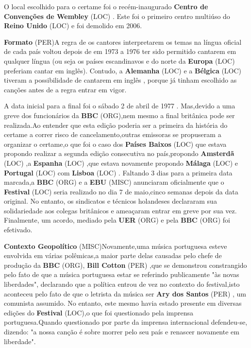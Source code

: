 \documentclass[12pt,a4paper]{article}
\begin{document}
O local escolhido para o certame foi o recém-inaugurado \textbf{Centro de Convenções de Wembley} (LOC) . Este foi o primeiro centro multiúso do \textbf{Reino Unido} (LOC) e foi demolido em 2006.



\textbf{Formato} (PER)A regra de os cantores interpretarem os temas na língua oficial de cada país voltou depois de em 1973 a 1976 ter sido permitido cantarem em qualquer língua (ou seja os países escandinavos e do norte da \textbf{Europa} (LOC) preferiam cantar em inglês). Contudo, a \textbf{Alemanha} (LOC) e a \textbf{Bélgica} (LOC) tiveram a possibilidade de cantarem em inglês , porque já tinham escolhido as canções antes de a regra entrar em vigor.

A data inicial para a final foi o sábado 2 de abril de 1977 . Mas,devido a uma greve dos funcionários da \textbf{BBC} (ORG),nem mesmo a final britânica pode ser realizada.Ao entender que esta edição poderia ser a primeira da história do certame a correr risco de cancelamento,outras emissoras se propuseram a organizar o certame,o que foi o caso dos \textbf{Países Baixos} (LOC) que estava propondo realizar a segunda edição consecutiva no país,propondo \textbf{Amsterdã} (LOC) ,a \textbf{Espanha} (LOC) ,que estava novamente propondo \textbf{Málaga} (LOC) e \textbf{Portugal} (LOC) com \textbf{Lisboa} (LOC) . Faltando 3 dias para a primeira data marcada,a \textbf{BBC} (ORG) e a \textbf{EBU} (MISC) anunciaram oficialmente que o \textbf{Festival} (LOC) seria realizado no dia 7 de maio,cinco semanas depois da data original. No entanto, os sindicatos e técnicos holandeses declararam sua solidariedade aos colegas britânicos e ameaçaram entrar em greve por sua vez. Finalmente, um acordo, mediado pela \textbf{UER} (ORG) e pela \textbf{BBC} (ORG) foi efetivado.



\textbf{Contexto Geopolítico} (MISC)Novamente,uma música portuguesa esteve envolvida em várias polêmicas,a maior parte delas causadas pelo chefe de produção da \textbf{BBC} (ORG), \textbf{Bill Cotton} (PER) ,que se demonstrou constrangido pelo fato de que a música portuguesa estar se referindo publicamente "às novas liberdades", declarando que a política entrou de vez no contexto do festival,isto aconteceu pelo fato de que o letrista da música ser \textbf{Ary dos Santos} (PER) , um comunista assumido. No entanto, este mesmo havia estado presente em diversas edições do \textbf{Festival} (LOC),o que foi questionado pela imprensa portuguesa.Quando questionado por parte da imprensa internacional defendeu-se, dizendo: "a nossa canção é sobre morrer pelo seu país e renascer novamente em liberdade".
\end{document}
